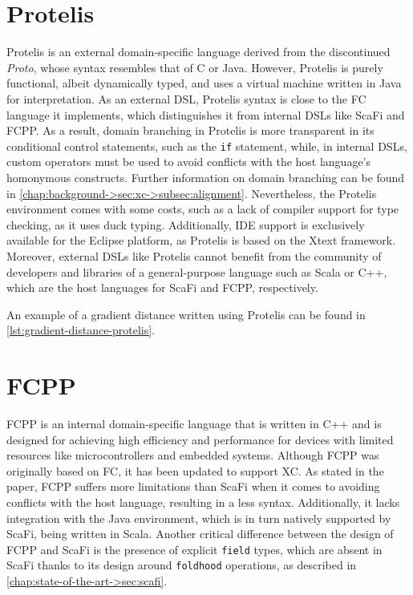 \section{Protelis} \label{chap:state-of-the-art->sec:protelis}

Protelis is an external domain-specific language derived from the discontinued \textit{Proto}, whose syntax resembles that of C or Java.
%
However, Protelis is purely functional, albeit dynamically typed, and uses a virtual machine written in Java\cite{protelis} for interpretation.
%
As an external \ac{DSL}, Protelis syntax is close to the \ac{FC} language it implements, which distinguishes it from internal \acp{DSL} like ScaFi and FCPP.
%
As a result, domain branching in Protelis is more transparent in its conditional control statements, such as the \texttt{if} statement, while, in internal DSLs, custom operators must be used to avoid conflicts with the host language's homonymous constructs. 
%
Further information on domain branching can be found in \cref{chap:background->sec:xc->subsec:alignment}.
%
Nevertheless, the Protelis environment comes with some costs, such as a lack of compiler support for type checking, as it uses duck typing.
%
Additionally, IDE support is exclusively available for the Eclipse platform, as Protelis is based on the Xtext framework\cite{xtext}.
%
Moreover, external \acp{DSL} like Protelis cannot benefit from the community of developers and libraries of a general-purpose language such as Scala or C++, which are the host languages for ScaFi and FCPP, respectively.

An example of a gradient distance written using Protelis can be found in \cref{lst:gradient-distance-protelis}.




\section{FCPP} \label{chap:state-of-the-art->sec:fcpp}

FCPP is an internal domain-specific language that is written in C++ and is designed for achieving high efficiency and performance for devices with limited resources like microcontrollers and embedded systems\cite{fcpp}.
%
Although FCPP was originally based on \ac{FC}, it has been updated to support \ac{XC}.
%
As stated in the paper, FCPP suffers more limitations than ScaFi when it comes to avoiding conflicts with the host language, resulting in a less  syntax\cite{fcpp}.
%
Additionally, it lacks integration with the Java environment, which is in turn natively supported by ScaFi, being written in Scala.
%
Another critical difference between the design of FCPP and ScaFi is the presence of explicit \texttt{field} types, which are absent in ScaFi thanks to its design around \texttt{foldhood} operations, as described in \cref{chap:state-of-the-art->sec:scafi}.

